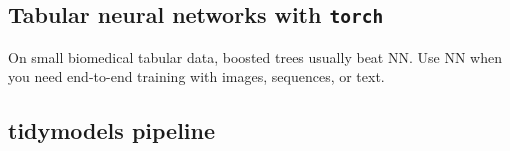 \documentclass[
]{article}
\newenvironment{Shaded}{\begin{snugshade}}{\end{snugshade}}
\newcommand{\CommentTok}[1]{\textcolor[rgb]{0.56,0.35,0.01}{\textit{#1}}}
\newcommand{\DecValTok}[1]{\textcolor[rgb]{0.00,0.00,0.81}{#1}}
\newcommand{\FunctionTok}[1]{\textcolor[rgb]{0.13,0.29,0.53}{\textbf{#1}}}
\newcommand{\NormalTok}[1]{#1}
\newcommand{\OtherTok}[1]{\textcolor[rgb]{0.56,0.35,0.01}{#1}}
\newcommand{\SpecialCharTok}[1]{\textcolor[rgb]{0.81,0.36,0.00}{\textbf{#1}}}
\begin{document}
\subsection{\texorpdfstring{Tabular neural networks with
\texttt{torch}}{Tabular neural networks with torch}}\label{tabular-neural-networks-with-torch}

\begin{Shaded}
\end{Shaded}

On small biomedical tabular data, boosted trees usually beat NN. Use NN
when you need end-to-end training with images, sequences, or text.

\subsection{tidymodels pipeline}\label{tidymodels-pipeline}
\end{document}
